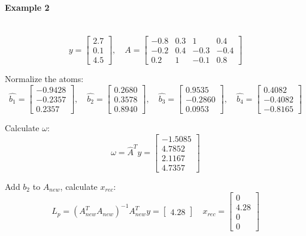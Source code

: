 \documentclass[12pt]{ctexart}
\begin{document}
\paragraph{\textbf{Example 2}}\mbox{}\\
\[
  y = \begin{bmatrix} 2.7 \\ 0.1 \\ 4.5\end{bmatrix}, \quad 
  A = \begin{bmatrix} -0.8 & 0.3 & 1 & 0.4 \\ -0.2 & 0.4 & -0.3 & -0.4 \\
  0.2 & 1 & -0.1 & 0.8 \end{bmatrix}
\]

Normalize the atoms:
\[
  \hat{b_1} = \begin{bmatrix}-0.9428 \\ -0.2357 \\ 0.2357\end{bmatrix}, \quad
  \hat{b_2} = \begin{bmatrix}0.2680 \\ 0.3578 \\ 0.8940\end{bmatrix}, \quad
  \hat{b_3} = \begin{bmatrix}0.9535 \\ -0.2860 \\ 0.0953\end{bmatrix}, \quad
  \hat{b_4} = \begin{bmatrix}0.4082 \\ -0.4082 \\ -0.8165\end{bmatrix}
\]

Calculate $\omega$:
\[
  \omega = \hat{A}^Ty = \begin{bmatrix} -1.5085 \\ 4.7852 \\ 2.1167 \\ 4.7357
  \end{bmatrix}
\]

Add $b_2$ to $A_{new}$, calculate $x_{rec}$:
\[
  L_p = (A_{new}^TA_{new})^{-1}A_{new}^Ty = \begin{bmatrix} 4.28 \end{bmatrix} \quad
  x_{rec} = \begin{bmatrix} 0 \\ 4.28 \\ 0 \\ 0 \end{bmatrix}
\]
\end{document}

